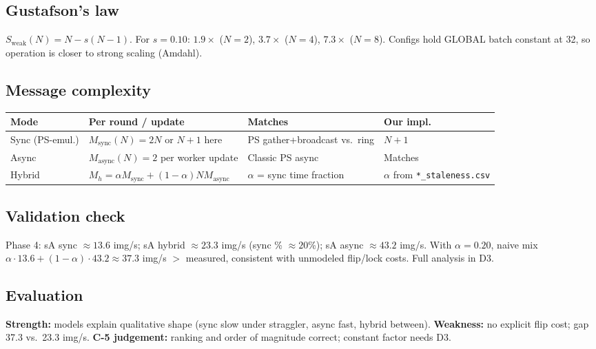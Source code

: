 \documentclass[11pt,a4paper]{article}
\begin{document}
\subsection{Gustafson's law}

$S_{\text{weak}}(N) = N - s(N-1)$. For $s=0.10$: $1.9\times$ ($N{=}2$), $3.7\times$ ($N{=}4$), $7.3\times$ ($N{=}8$). Configs hold GLOBAL batch constant at 32, so operation is closer to strong scaling (Amdahl).

\subsection{Message complexity}

\begin{table}[htbp]
  \centering
  \footnotesize
  \begin{tabularx}{\linewidth}{@{}l L L L@{}}
    \toprule
    \textbf{Mode} & \textbf{Per round / update} & \textbf{Matches} & \textbf{Our impl.} \\
    \midrule
    Sync (PS-emul.) & $M_{\text{sync}}(N)=2N$ or $N{+}1$ here & PS gather+broadcast vs.\ ring & $N{+}1$ \\
    Async & $M_{\text{async}}(N)=2$ per worker update & Classic PS async & Matches \\
    Hybrid & $M_h = \alpha M_{\text{sync}} + (1-\alpha) N M_{\text{async}}$ & $\alpha$ = sync time fraction & $\alpha$ from \texttt{*\_staleness.csv} \\
    \bottomrule
  \end{tabularx}
\end{table}

\subsection{Validation check}

Phase 4: sA sync ${\approx}13.6$ img/s; sA hybrid ${\approx}23.3$ img/s (sync \% ${\approx}20$\%); sA async ${\approx}43.2$ img/s. With $\alpha=0.20$, naive mix $\alpha\cdot 13.6 + (1-\alpha)\cdot 43.2 \approx 37.3$ img/s $>$ measured, consistent with unmodeled flip/lock costs. Full analysis in D3.

\subsection{Evaluation}
\textbf{Strength:} models explain qualitative shape (sync slow under straggler, async fast, hybrid between). \textbf{Weakness:} no explicit flip cost; gap 37.3 vs.\ 23.3 img/s. \textbf{C-5 judgement:} ranking and order of magnitude correct; constant factor needs D3.
\end{document}
